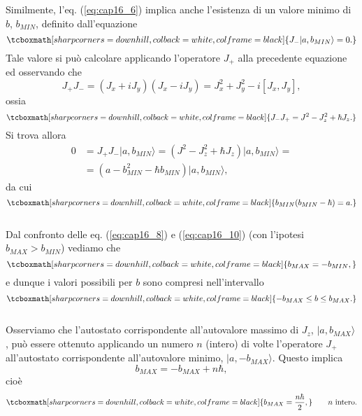 \documentclass[a4paper,12pt,oneside]{book}
\begin{document}
Similmente, l'eq. (\ref{eq:cap16_6}) implica anche l'esistenza di un valore minimo di $b$,  $b_{MIN}$, definito dall'equazione
	\begin{equation}
		\tcboxmath[sharp corners=downhill, colback=white, colframe=black]{
			J_{-} \vert a, b_{MIN} \rangle =0.
			}
	\end{equation}
Tale valore si può calcolare applicando l'operatore $J_+$ alla precedente equazione ed osservando che
	\begin{equation}
		J_+J_- = (J_x+iJ_y)(J_x-iJ_y)= J_x^2 +J_y ^2-i[J_x, J_y] ,
	\end{equation}
ossia
	\begin{equation}
		\tcboxmath[sharp corners=downhill, colback=white, colframe=black]{
			J_-J_+ = J^2 -J_z ^2 +\hbar J_z .
			}
	\label{eq:cap16_9}
	\end{equation}
Si trova allora
	\begin{align}
		0&=J_{+}J_{-} \vert a, b_{MIN} \rangle = (J^2 -J_z ^2 +\hbar J_z)\vert a, b_{MIN} \rangle = \nonumber \\
		&=(a- b_{MIN} ^2 - \hbar b_{MIN} )\vert a, b_{MIN} \rangle ,
	\end{align}
da cui
	\begin{equation}
		\tcboxmath[sharp corners=downhill, colback=white, colframe=black]{
			b_{MIN}(b_{MIN}-\hbar) =a .
			}
	\label{eq:cap16_10}
	\end{equation}\\
	
Dal confronto delle eq. (\ref{eq:cap16_8}) e (\ref{eq:cap16_10}) (con l'ipotesi $b_{MAX} > b_{MIN}$) vediamo che
	\begin{equation}
		\tcboxmath[sharp corners=downhill, colback=white, colframe=black]{
			b_{MAX} = - b_{MIN} ,
			}
	\end{equation}
e dunque i valori possibili per $b$ sono compresi nell'intervallo
	\begin{equation}
		\tcboxmath[sharp corners=downhill, colback=white, colframe=black]{
			-b_{MAX} \leq b \leq b_{MAX} .
			}
	\end{equation}\\
	
Osserviamo che l'autostato corrispondente all'autovalore massimo di $J_z$, $\vert a, b_{MAX}\rangle$, può essere ottenuto applicando un numero $n$ (intero) di volte l'operatore $J_+$ all'autostato corrispondente all'autovalore minimo, $\vert a, - b_{MAX}\rangle $. Questo implica
	\begin{equation}
		b_{MAX}=-b_{MAX}+n\hbar, 
	\end{equation}
cioè
	\begin{equation}
		\tcboxmath[sharp corners=downhill, colback=white, colframe=black]{
			b_{MAX}=\frac{n\hbar}{2},
			} \qquad n\textrm{ intero.}
	\end{equation}\\
	
\end{document}
